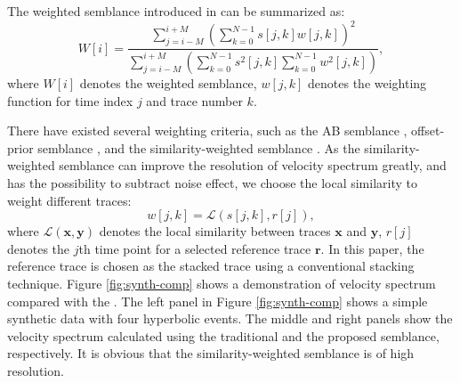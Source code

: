 The weighted semblance introduced in \cite{yangkang2015vel} can be summarized as:
\begin{equation}
\label{eq:semb-weight}
W[i] = \frac{\displaystyle\sum_{j=i-M}^{i+M}\left(\sum_{k=0}^{N-1}s[j,k]w[j,k]\right)^2}{\displaystyle \sum_{j=i-M}^{i+M}\left(\sum_{k=0}^{N-1}s^2[j,k]\sum_{k=0}^{N-1}w^2[j,k]\right)},
\end{equation}
where $W[i]$ denotes the weighted semblance, $w[j,k]$ denotes the weighting function for time index $j$ and trace number $k$.

There have existed several weighting criteria, such as the AB semblance \cite[]{fomel20091}, offset-prior semblance \cite[]{luosimon2012}, and the similarity-weighted semblance \cite[]{yangkang2015vel}. As the similarity-weighted semblance can improve the resolution of velocity spectrum greatly, and has the possibility to subtract noise effect, we choose the local similarity \cite[]{fomel2007localattr} to weight different traces:
\begin{equation}
\label{eq:simiweight}
w[j,k]=\mathcal{L}(s[j,k],r[j]),
\end{equation}
where $\mathcal{L}(\mathbf{x},\mathbf{y})$ denotes the local similarity between traces $\mathbf{x}$ and $\mathbf{y}$, $r[j]$ denotes the $j$th time point for a selected reference trace $\mathbf{r}$. In this paper, the reference trace is chosen as the stacked trace using a conventional stacking technique. Figure \ref{fig:synth-comp} shows a demonstration of   velocity spectrum  compared with the . The left panel in Figure \ref{fig:synth-comp} shows a simple synthetic data with four hyperbolic events. The middle and right panels show the velocity spectrum calculated using the traditional and the proposed semblance, respectively. It is obvious that the similarity-weighted semblance is of  high resolution.



